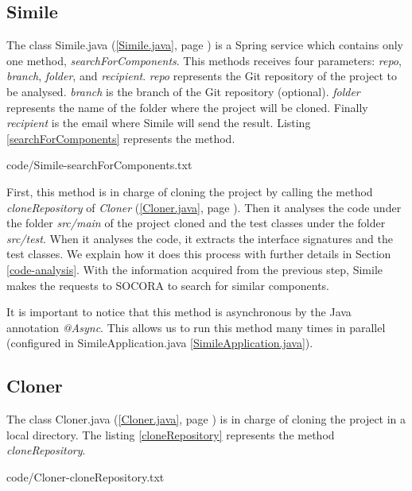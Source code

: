 \subsection{Simile}
The class Simile.java (\ref{Simile.java}, page \pageref{Simile.java}) is a Spring service which contains only one method, \emph{searchForComponents}. This methods receives four parameters: \emph{repo}, \emph{branch}, \emph{folder}, and \emph{recipient}. \emph{repo} represents the Git repository of the project to be analysed. \emph{branch} is the branch of the Git repository (optional). \emph{folder} represents the name of the folder where the project will be cloned. Finally \emph{recipient} is the email where Simile will send the result. Listing \ref{searchForComponents} represents the method.


{code/Simile-searchForComponents.txt}

First, this method is in charge of cloning the project by calling the method \emph{cloneRepository} of \emph{Cloner} (\ref{Cloner.java}, page \pageref{Cloner.java}). Then it analyses the code under the folder \emph{src/main} of the project cloned and the test classes under the folder \emph{src/test}. When it analyses the code, it extracts the interface signatures and the test classes. We explain how it does this process with further details in Section \ref{code-analysis}. With the information acquired from the previous step, Simile makes the requests to SOCORA to search for similar components.

It is important to notice that this method is asynchronous by the Java annotation \emph{@Async}. This allows us to run this method many times in parallel (configured in SimileApplication.java \ref{SimileApplication.java}).

\subsection{Cloner}
\label{simile:cloner}
The class Cloner.java (\ref{Cloner.java}, page \pageref{Cloner.java}) is in charge of cloning the project in a local directory. The listing \ref{cloneRepository} represents the method \emph{cloneRepository}.


{code/Cloner-cloneRepository.txt}

